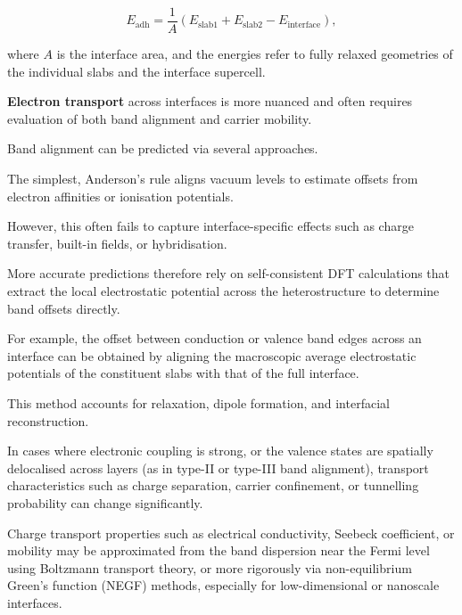 \[ E_\mathrm{adh} = \frac{1}{A} \left( E_\mathrm{slab1} + E_\mathrm{slab2} - E_\mathrm{interface} \right), \]

where $A$ is the interface area, and the energies refer to fully relaxed geometries of the individual slabs and the
interface supercell.




\textbf{Electron transport} across interfaces is more nuanced and often requires evaluation of both band alignment and
carrier mobility.

Band alignment can be predicted via several approaches.

The simplest, Anderson's rule aligns vacuum levels to estimate offsets from electron affinities or ionisation
potentials.

However, this often fails to capture interface-specific effects such as charge transfer, built-in fields, or
hybridisation.

More accurate predictions therefore rely on self-consistent DFT calculations that extract the local electrostatic
potential across the heterostructure to determine band offsets directly.


For example, the offset between conduction or valence band edges across an interface can be obtained by aligning the
macroscopic average electrostatic potentials of the constituent slabs with that of the full interface.

This method accounts for relaxation, dipole formation, and interfacial reconstruction.

In cases where electronic coupling is strong, or the valence states are spatially delocalised across layers (as in
type-II or type-III band alignment), transport characteristics such as charge separation, carrier confinement, or
tunnelling probability can change significantly.


Charge transport properties such as electrical conductivity, Seebeck coefficient, or mobility may be
approximated from the band dispersion near the Fermi level using Boltzmann transport theory, or more rigorously via
non-equilibrium Green's function (NEGF) methods, especially for low-dimensional or nanoscale interfaces.

